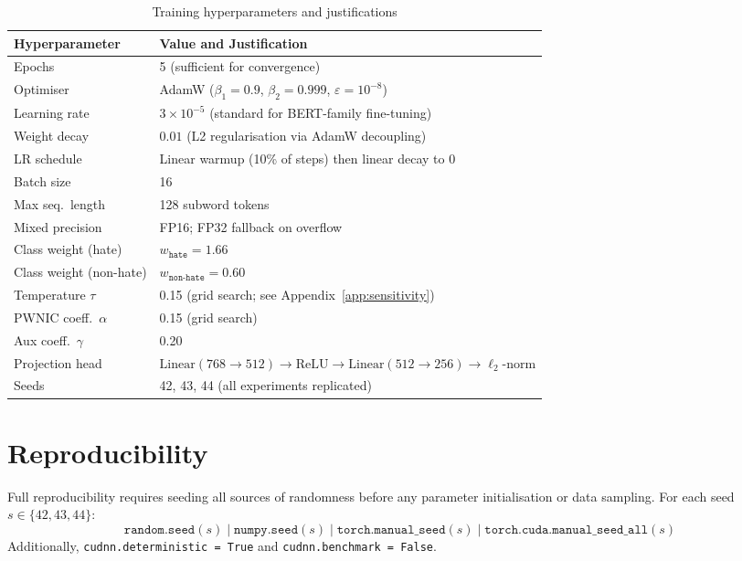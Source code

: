 \documentclass[12pt,a4paper]{report}
\begin{document}
\begin{table}[H]
\centering
\caption{Training hyperparameters and justifications}
\label{tab:hparams}
\small
\begin{tabular}{lp{7cm}}
\toprule
\textbf{Hyperparameter} & \textbf{Value and Justification}\\
\midrule
Epochs & 5 (sufficient for convergence) \\
Optimiser & AdamW \cite{loshchilov2019decoupled} ($\beta_1{=}0.9$, $\beta_2{=}0.999$, $\varepsilon{=}10^{-8}$) \\
Learning rate & $3 \times 10^{-5}$ (standard for BERT-family fine-tuning) \\
Weight decay & $0.01$ (L2 regularisation via AdamW decoupling) \\
LR schedule & Linear warmup (10\% of steps) then linear decay to 0 \\
Batch size & 16 \\
Max seq.\ length & 128 subword tokens \\
Mixed precision & FP16; FP32 fallback on overflow \\
Class weight (hate) & $w_{\texttt{hate}} = 1.66$ \\
Class weight (non-hate) & $w_{\texttt{non-hate}} = 0.60$ \\
Temperature $\tau$ & 0.15 (grid search; see Appendix~\ref{app:sensitivity}) \\
PWNIC coeff.\ $\alpha$ & 0.15 (grid search) \\
Aux coeff.\ $\gamma$ & 0.20 \\
Projection head & $\mathrm{Linear}(768{\to}512) \to \mathrm{ReLU} \to \mathrm{Linear}(512{\to}256) \to \ell_2\text{-norm}$ \\
Seeds & 42, 43, 44 (all experiments replicated) \\
\bottomrule
\end{tabular}
\end{table}

\section{Reproducibility}
Full reproducibility requires seeding all sources of randomness before any parameter initialisation or data sampling. For each seed $s \in \{42, 43, 44\}$:
\begin{equation}
  \texttt{random.seed}(s) \;\Big|\; \texttt{numpy.seed}(s) \;\Big|\; \texttt{torch.manual\_seed}(s) \;\Big|\; \texttt{torch.cuda.manual\_seed\_all}(s)
  \label{eq:seeding}
\end{equation}
Additionally, \texttt{cudnn.deterministic = True} and \texttt{cudnn.benchmark = False}.
\end{document}

